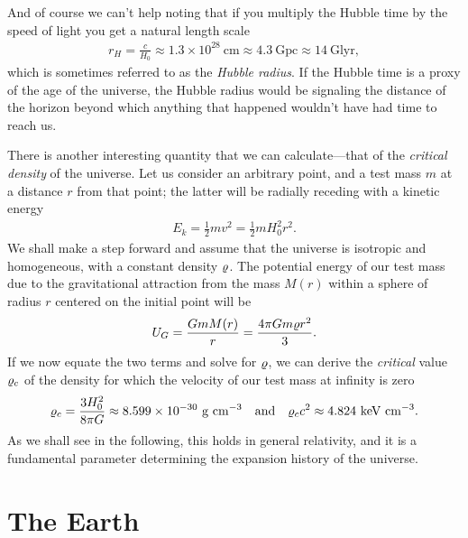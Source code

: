 And of course we can't help noting that if you multiply the Hubble time by the speed
of light you get a natural length scale
\begin{align*}
  r_H = \frac{c}{H_0} \approx 1.3 \times 10^{28}~\text{cm}
  \approx 4.3~\text{Gpc} \approx 14~\text{Glyr},
\end{align*}
which is sometimes referred to as the \emph{Hubble radius}. If the Hubble time is a
proxy of the age of the universe, the Hubble radius would be signaling the distance
of the horizon beyond which anything that happened wouldn't have had time to reach us.

There is another interesting quantity that we can calculate---that of the
\emph{critical density} of the universe. Let us consider an arbitrary point, and
a test mass $m$ at a distance $r$ from that point; the latter will be radially
receding with a kinetic energy
\begin{align*}
  E_k = \frac{1}{2}mv^2 = \frac{1}{2}mH_0^2 r^2.
\end{align*}
We shall make a step forward and assume that the universe is isotropic and
homogeneous, with a constant density $\varrho$. The potential energy of our test
mass due to the gravitational attraction from the mass $M(r)$ within a sphere of radius
$r$ centered on the initial point will be
\begin{align*}
  U_G = \frac{G m M(r)}{r} = \frac{4\pi Gm \varrho r^2}{3}.
\end{align*}
If we now equate the two terms and solve for $\varrho$, we can derive the \emph{critical}
value $\varrho_c$ of the density for which the velocity of our test mass at infinity
is zero
\begin{align}
  \varrho_c = \frac{3H_0^2}{8\pi G} \approx 8.599 \times 10^{-30}~\text{g~cm}^{-3}
	\quad\text{and}\quad
	\varrho_c c^2 \approx 4.824~\text{keV}~\text{cm}^{-3}.
\end{align}
As we shall see in the following, this holds in general relativity, and it is a
fundamental parameter determining the expansion history of the universe.



\section{The Earth}
\label{sec:earth}

